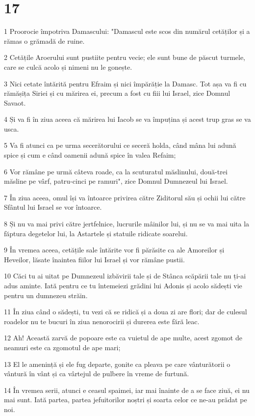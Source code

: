\chapter{17}

\par 1 Proorocie împotriva Damascului: "Damascul este scos din numărul cetăților și a rămas o grămadă de ruine.
\par 2 Cetățile Aroerului sunt pustiite pentru vecie; ele sunt bune de păscut turmele, care se culcă acolo și nimeni nu le gonește.
\par 3 Nici cetate întărită pentru Efraim și nici împărăție la Damasc. Tot așa va fi cu rămășița Siriei și cu mărirea ei, precum a fost cu fiii lui Israel, zice Domnul Savaot.
\par 4 Și va fi în ziua aceea că mărirea lui Iacob se va împuțina și acest trup gras se va usca.
\par 5 Va fi atunci ca pe urma secerătorului ce seceră holda, când mâna lui adună spice și cum e când oamenii adună spice în valea Refaim;
\par 6 Vor rămâne pe urmă câteva roade, ca la scuturatul măslinului, două-trei măsline pe vârf, patru-cinci pe ramuri", zice Domnul Dumnezeul lui Israel.
\par 7 În ziua aceea, omul își va întoarce privirea către Ziditorul său și ochii lui către Sfântul lui Israel se vor întoarce.
\par 8 Și nu va mai privi către jertfelnice, lucrurile mâinilor lui, și nu se va mai uita la făptura degetelor lui, la Astartele și statuile ridicate soarelui.
\par 9 În vremea aceea, cetățile sale întărite vor fi părăsite ca ale Amoreilor și Heveilor, lăsate înaintea fiilor lui Israel și vor rămâne pustii.
\par 10 Căci tu ai uitat pe Dumnezeul izbăvirii tale și de Stânca scăpării tale nu ți-ai adus aminte. Iată pentru ce tu întemeiezi grădini lui Adonis și acolo sădești vie pentru un dumnezeu străin.
\par 11 În ziua când o sădești, tu vezi că se ridică și a doua zi are flori; dar de culesul roadelor nu te bucuri în ziua nenorocirii și durerea este fără leac.
\par 12 Ah! Această zarvă de popoare este ca vuietul de ape multe, acest zgomot de neamuri este ca zgomotul de ape mari;
\par 13 El le amenință și ele fug departe, gonite ca pleava pe care vânturătorii o vântură în vânt și ca vârtejul de pulbere în vreme de furtună.
\par 14 În vremea serii, atunci e ceasul spaimei, iar mai înainte de a se face ziuă, ei nu mai sunt. Iată partea, partea jefuitorilor noștri și soarta celor ce ne-au prădat pe noi.

